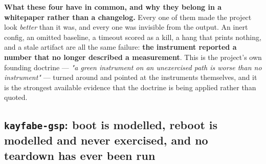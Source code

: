 \documentclass[10.5pt]{article}
\begin{document}
\begin{claimbox}\small
\textbf{What these four have in common, and why they belong in a whitepaper rather than a
changelog.} Every one of them made the project look \emph{better} than it was, and every one was
invisible from the output. An inert config, an omitted baseline, a timeout scored as a kill, a
hang that prints nothing, and a stale artifact are all the same failure: \textbf{the instrument
reported a number that no longer described a measurement}. This is the project's own founding
doctrine — \emph{"a green instrument on an unexercised path is worse than no instrument"} — turned
around and pointed at the instruments themselves, and it is the strongest available evidence that
the doctrine is being applied rather than quoted.
\end{claimbox}

\subsection{\texorpdfstring{\texttt{kayfabe-gsp}: boot is modelled, reboot is modelled and never exercised, and no teardown has ever been run}{kayfabe-gsp: boot is modelled, reboot is modelled and never exercised}}
\label{sec:gsp}
\end{document}
